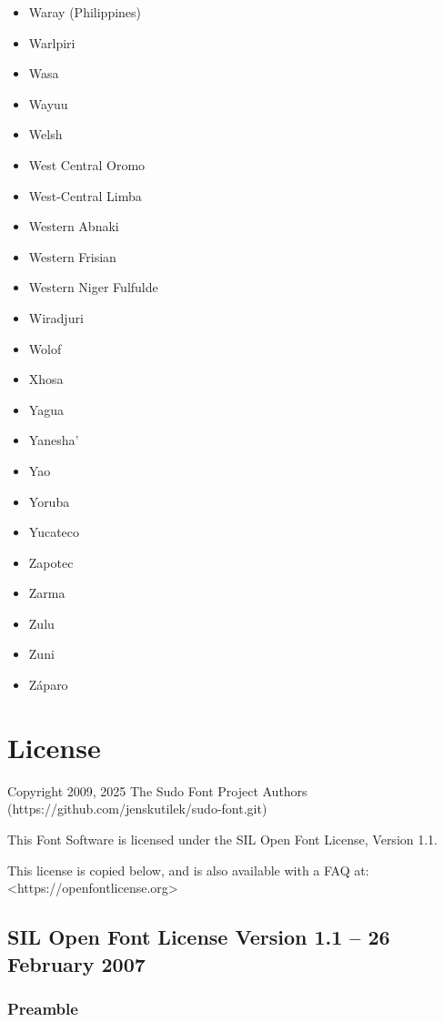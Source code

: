 \documentclass[paper=a4, 10pt]{scrbook}
\begin{document}
\begin{multicols}{3}
\begin{itemize}
        \item Waray (Philippines)
        \item Warlpiri
        \item Wasa
        \item Wayuu
        \item Welsh
        \item West Central Oromo
        \item West-Central Limba
        \item Western Abnaki
        \item Western Frisian
        \item Western Niger Fulfulde
        \item Wiradjuri
        \item Wolof
        \item Xhosa
        \item Yagua
        \item Yanesha’
        \item Yao
        \item Yoruba
        \item Yucateco
        \item Zapotec
        \item Zarma
        \item Zulu
        \item Zuni
        \item Záparo
    \end{itemize}
\end{multicols}

\chapter{License}

Copyright 2009, 2025 The Sudo Font Project Authors (https://github.com/jenskutilek/sudo-font.git)

This Font Software is licensed under the SIL Open Font License, Version 1.1.

This license is copied below, and is also available with a FAQ at: <https://openfontlicense.org>


\section{SIL Open Font License Version 1.1 – 26 February 2007}

\subsection{Preamble}
\end{document}
